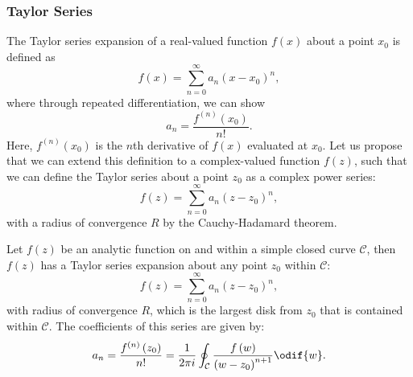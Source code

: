 \documentclass{article}
\begin{document}
\subsubsection{Taylor Series}
The Taylor series expansion of a real-valued function \(f\left( x
\right)\) about a point \(x_0\) is defined as
\begin{equation*}
    f\left( x \right) = \sum_{n = 0}^\infty a_n \left( x - x_0 \right)^n,
\end{equation*}
where through repeated differentiation, we can show
\begin{equation*}
    a_n = \frac{f^{\left( n \right)}\left( x_0 \right)}{n!}.
\end{equation*}
Here, \(f^{\left( n \right)}\left( x_0 \right)\) is the \(n\)th
derivative of \(f\left( x \right)\) evaluated at \(x_0\).
Let us propose that we can extend this definition to a complex-valued
function \(f\left( z \right)\), such that we can define the
Taylor series about a point \(z_0\) as a complex power series:
\begin{equation*}
    f\left( z \right) = \sum_{n = 0}^\infty a_n \left( z - z_0 \right)^n,
\end{equation*}
with a radius of convergence \(R\) by the Cauchy-Hadamard theorem.
\begin{theorem}
    Let \(f\left( z \right)\) be an analytic function on and within a
    simple closed curve \(\mathcal{C}\), then \(f\left( z \right)\) has a
    Taylor series expansion about any point \(z_0\) within \(\mathcal{C}\):
    \begin{equation*}
        f\left( z \right) = \sum_{n = 0}^\infty a_n \left( z - z_0 \right)^n,
    \end{equation*}
    with radius of convergence \(R\), which is the largest disk from
    \(z_0\) that is contained within \(\mathcal{C}\). The coefficients
    of this series are given by:
    \begin{equation*}
        a_n = \frac{f^{\left( n \right)}\left( z_0 \right)}{n!} = \frac{1}{2 \pi i} \oint_{\mathcal{C}} \frac{f\left( w \right)}{\left( w - z_0 \right)^{n + 1}} \odif{w}.
    \end{equation*}
\end{theorem}
\end{document}
